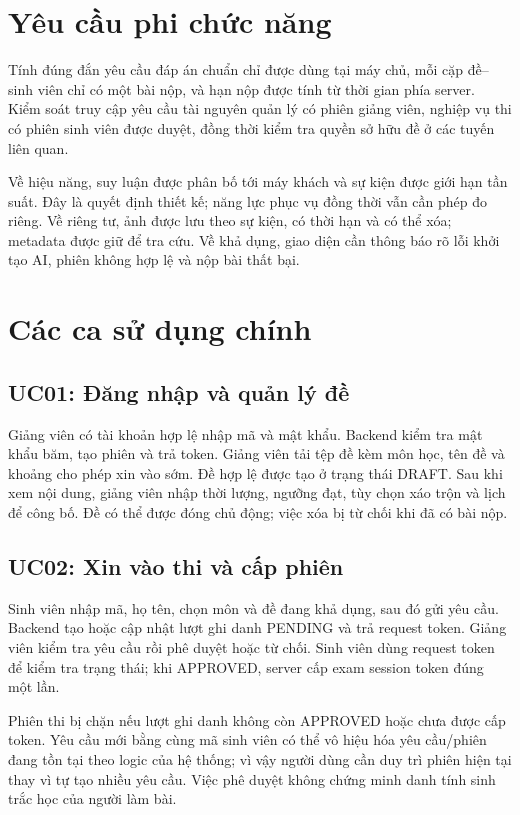 \section{Yêu cầu phi chức năng}
Tính đúng đắn yêu cầu đáp án chuẩn chỉ được dùng tại máy chủ, mỗi cặp đề--sinh viên chỉ có một bài nộp, và hạn nộp được tính từ thời gian phía server. Kiểm soát truy cập yêu cầu tài nguyên quản lý có phiên giảng viên, nghiệp vụ thi có phiên sinh viên được duyệt, đồng thời kiểm tra quyền sở hữu đề ở các tuyến liên quan.

Về hiệu năng, suy luận được phân bố tới máy khách và sự kiện được giới hạn tần suất. Đây là quyết định thiết kế; năng lực phục vụ đồng thời vẫn cần phép đo riêng. Về riêng tư, ảnh được lưu theo sự kiện, có thời hạn và có thể xóa; metadata được giữ để tra cứu. Về khả dụng, giao diện cần thông báo rõ lỗi khởi tạo AI, phiên không hợp lệ và nộp bài thất bại.

\section{Các ca sử dụng chính}
\subsection{UC01: Đăng nhập và quản lý đề}
Giảng viên có tài khoản hợp lệ nhập mã và mật khẩu. Backend kiểm tra mật khẩu băm, tạo phiên và trả token. Giảng viên tải tệp đề kèm môn học, tên đề và khoảng cho phép xin vào sớm. Đề hợp lệ được tạo ở trạng thái DRAFT. Sau khi xem nội dung, giảng viên nhập thời lượng, ngưỡng đạt, tùy chọn xáo trộn và lịch để công bố. Đề có thể được đóng chủ động; việc xóa bị từ chối khi đã có bài nộp.

\subsection{UC02: Xin vào thi và cấp phiên}
Sinh viên nhập mã, họ tên, chọn môn và đề đang khả dụng, sau đó gửi yêu cầu. Backend tạo hoặc cập nhật lượt ghi danh PENDING và trả request token. Giảng viên kiểm tra yêu cầu rồi phê duyệt hoặc từ chối. Sinh viên dùng request token để kiểm tra trạng thái; khi APPROVED, server cấp exam session token đúng một lần.

Phiên thi bị chặn nếu lượt ghi danh không còn APPROVED hoặc chưa được cấp token. Yêu cầu mới bằng cùng mã sinh viên có thể vô hiệu hóa yêu cầu/phiên đang tồn tại theo logic của hệ thống; vì vậy người dùng cần duy trì phiên hiện tại thay vì tự tạo nhiều yêu cầu. Việc phê duyệt không chứng minh danh tính sinh trắc học của người làm bài.

